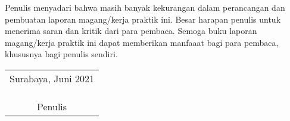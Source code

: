 Penulis menyadari bahwa masih banyak kekurangan dalam perancangan dan pembuatan laporan magang/kerja praktik ini.
Besar harapan penulis untuk menerima saran dan kritik dari para pembaca.
Semoga buku laporan magang/kerja praktik ini dapat memberikan manfaaat bagi para pembaca, khususnya bagi penulis sendiri.

\begin{flushright}
  \begin{tabular}[b]{c}
    Surabaya, Juni 2021
    \\
    \\
    \\
    \\
    Penulis
  \end{tabular}
\end{flushright}
